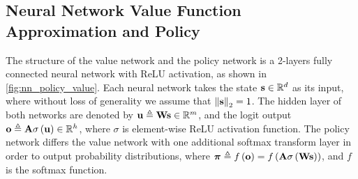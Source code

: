 

\subsection{Neural Network Value Function Approximation and Policy}
\label{subsec:nn_value_policy}
The structure of the value network and the policy network  is a 2-layers fully connected neural network with ReLU activation, as shown in \cref{fig:nn_policy_value}. 
Each neural network takes the state ${\mathbf{s}} \in {\mathbb{R}}^d$ as its input, where without loss of generality we assume that $\left\| {\mathbf{s}} \right\|_2 = 1$.
The hidden layer of both networks are denoted by ${\mathbf{u}} \triangleq {\mathbf{W}}{\mathbf{s}}\in{\mathbb{R}}^m$, and the logit output ${\mathbf{o}} \triangleq {\mathbf{A}}\sigma\left( {\mathbf{u}}\right) \in {\mathbb{R}}^h$, where $\sigma$ is element-wise ReLU activation function. The policy network differs the value network with one additional softmax transform layer in order to output probability distributions, where ${\boldsymbol{\pi}} \triangleq f\left( {\mathbf{o}} \right) = f\left( {\mathbf{A}} \sigma\left( {\mathbf{W}} {\mathbf{s}} \right) \right)$, and $f$ is the softmax function. 

